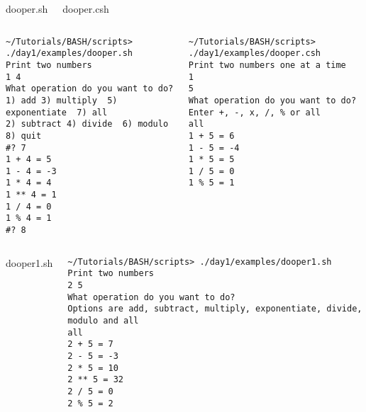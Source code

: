 \documentclass[10pt,t]{beamer}
\begin{document}
\begin{frame}[fragile]
  \begin{columns}
    \vspace{-0.5cm}
    \begin{exampleblock}{dooper.sh}
      
    \end{exampleblock}
    \vspace{-0.5cm}
    \begin{block}{dooper.csh}
      
    \end{block}
  \end{columns}
\end{frame}

\begin{frame}[fragile]
  \begin{columns}
      \begin{lstlisting}[style=LINUX,basicstyle=\tiny\ttfamily]
~/Tutorials/BASH/scripts> ./day1/examples/dooper.sh
Print two numbers
1 4
What operation do you want to do?
1) add 3) multiply  5) exponentiate  7) all
2) subtract 4) divide  6) modulo   8) quit
#? 7
1 + 4 = 5
1 - 4 = -3
1 * 4 = 4
1 ** 4 = 1
1 / 4 = 0
1 % 4 = 1
#? 8
      \end{lstlisting}
      \begin{lstlisting}[style=LINUX,basicstyle=\tiny\ttfamily]
~/Tutorials/BASH/scripts> ./day1/examples/dooper.csh 
Print two numbers one at a time
1
5
What operation do you want to do?
Enter +, -, x, /, % or all
all
1 + 5 = 6
1 - 5 = -4
1 * 5 = 5
1 / 5 = 0
1 % 5 = 1
        \end{lstlisting}
  \end{columns}
\end{frame}

\begin{frame}[fragile]
  \begin{columns}
    \begin{exampleblock}{dooper1.sh}
      
    \end{exampleblock}
    \begin{lstlisting}[style=LINUX,basicstyle=\tiny\ttfamily]
~/Tutorials/BASH/scripts> ./day1/examples/dooper1.sh
Print two numbers
2 5
What operation do you want to do?
Options are add, subtract, multiply, exponentiate, divide, modulo and all
all
2 + 5 = 7
2 - 5 = -3
2 * 5 = 10
2 ** 5 = 32
2 / 5 = 0
2 % 5 = 2
    \end{lstlisting}
  \end{columns}
\end{frame}
\end{document}

